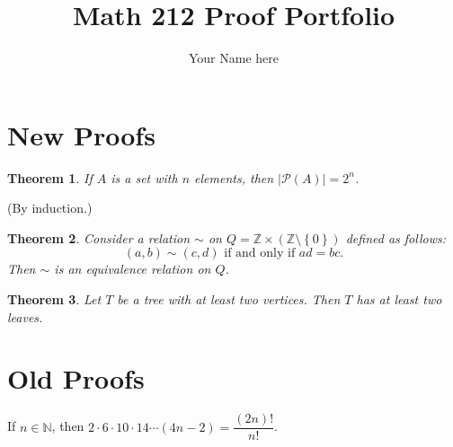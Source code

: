 \documentclass[12pt]{article}
\title{Math 212 Proof Portfolio}
\author{Your Name here}
\date{}                                           %
\def\set#1{\left\{ {#1} \right\}}
\def\Z{{\mathbb Z}}
\def\N{{\mathbb N}}
\theoremstyle{plain}
\newtheorem{thm}{Theorem}
\theoremstyle{definition}
\newenvironment{statement}[1]
  {\renewcommand\theinnerstatement{#1}\innerstatement}
  {\endinnerstatement}
\renewenvironment{proof}[1][\proofname]{\begin{trivlist}\pushQED{\qed}\item[\hskip \labelsep  \bfseries #1{}.\hspace{10pt}]}
{\popQED\end{trivlist}}
\begin{document}
\maketitle




\newpage


\section{New Proofs}


\begin{thm}
	If $A$ is a set with $n$ elements, then $|\mathcal{P}(A)| = 2^n$.
\end{thm}

\begin{proof}
(By induction.) %


\end{proof}



\begin{thm}
	Consider a relation $\sim$ on $Q = \Z\times (\Z\setminus \set{0})$ defined as follows:
	\[
		(a,b) \sim (c,d) \text{ if and only if } ad = bc.
	\]
	Then $\sim$ is an equivalence relation on $Q$.
\end{thm}

\begin{proof}

\end{proof}



\begin{thm}
	Let $T$ be a tree with at least two vertices. Then $T$ has at least two leaves.
\end{thm}

\begin{proof} %
	
\end{proof}



\newpage

\section{Old Proofs}


\begin{statement}{3.37}
	If $n\in \N$, then $2\cdot 6\cdot 10\cdot 14 \cdots (4n-2) = \dfrac{(2n)!}{n!}$.
\end{statement}
\end{document}
